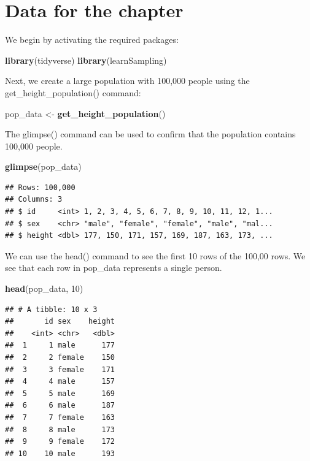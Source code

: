 \documentclass[
]{krantz}
\makeatletter
\newenvironment{Shaded}{\begin{snugshade}}{\end{snugshade}}
\newcommand{\DecValTok}[1]{\textcolor[rgb]{0.06,0.06,0.06}{#1}}
\newcommand{\KeywordTok}[1]{\textcolor[rgb]{0.27,0.27,0.27}{\textbf{#1}}}
\newcommand{\NormalTok}[1]{#1}
\newcommand{\StringTok}[1]{\textcolor[rgb]{0.5,0.5,0.5}{#1}}
\newenvironment{kframe}{%
\medskip{}
\setlength{\fboxsep}{.8em}
 \def\at@end@of@kframe{}%
 \ifinner\ifhmode%
  \def\at@end@of@kframe{\end{minipage}}%
  \begin{minipage}{\columnwidth}%
 \fi\fi%
 \def\FrameCommand##1{\hskip\@totalleftmargin \hskip-\fboxsep
 \colorbox{shadecolor}{##1}\hskip-\fboxsep
     \hskip-\linewidth \hskip-\@totalleftmargin \hskip\columnwidth}%
 \MakeFramed {\advance\hsize-\width
   \@totalleftmargin\z@ \linewidth\hsize
   \@setminipage}}%
 {\par\unskip\endMakeFramed%
 \at@end@of@kframe}
\renewenvironment{Shaded}{\begin{kframe}}{\end{kframe}}
\makeatother
\begin{document}
\hypertarget{data-for-the-chapter}{%
\section{Data for the chapter}\label{data-for-the-chapter}}

We begin by activating the required packages:

\begin{Shaded}
\begin{Highlighting}[]
\KeywordTok{library}\NormalTok{(tidyverse)}
\KeywordTok{library}\NormalTok{(learnSampling)}
\end{Highlighting}
\end{Shaded}

Next, we create a large population with 100,000 people using the get\_height\_population() command:

\begin{Shaded}
\begin{Highlighting}[]
\NormalTok{pop_data <-}\StringTok{ }\KeywordTok{get_height_population}\NormalTok{() }
\end{Highlighting}
\end{Shaded}

The glimpse() command can be used to confirm that the population contains 100,000 people.

\begin{Shaded}
\begin{Highlighting}[]
\KeywordTok{glimpse}\NormalTok{(pop_data)}
\end{Highlighting}
\end{Shaded}

\begin{verbatim}
## Rows: 100,000
## Columns: 3
## $ id     <int> 1, 2, 3, 4, 5, 6, 7, 8, 9, 10, 11, 12, 1...
## $ sex    <chr> "male", "female", "female", "male", "mal...
## $ height <dbl> 177, 150, 171, 157, 169, 187, 163, 173, ...
\end{verbatim}

We can use the head() command to see the first 10 rows of the 100,00 rows. We see that each row in pop\_data represents a single person.

\begin{Shaded}
\begin{Highlighting}[]
\KeywordTok{head}\NormalTok{(pop_data, }\DecValTok{10}\NormalTok{)}
\end{Highlighting}
\end{Shaded}

\begin{verbatim}
## # A tibble: 10 x 3
##       id sex    height
##    <int> <chr>   <dbl>
##  1     1 male      177
##  2     2 female    150
##  3     3 female    171
##  4     4 male      157
##  5     5 male      169
##  6     6 male      187
##  7     7 female    163
##  8     8 male      173
##  9     9 female    172
## 10    10 male      193
\end{verbatim}
\end{document}
